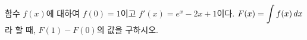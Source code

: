 함수 $f(x)$에 대하여 $f(0)=1$이고 $f'(x)=e^x-2x+1$이다. $F(x)=\displaystyle\int f(x)\mkern3mu dx$라 할 때, $F(1)-F(0)$의 값을 구하시오.
